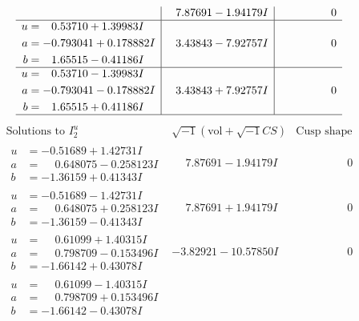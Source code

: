 \documentclass[1p]{elsarticle_modified}
\theoremstyle{definition}
\newcommand{\I}{\sqrt{-1}}
\begin{document}
$$\begin{array}{c|c|c}
 & \phantom{-}7.87691 - 1.94179 I & \phantom{-0.000000 } 0 \\ \hline\begin{aligned}
u &= \phantom{-}0.53710 + 1.39983 I \\
a &= -0.793041 + 0.178882 I \\
b &= \phantom{-}1.65515 - 0.41186 I\end{aligned}
 & \phantom{-}3.43843 - 7.92757 I & \phantom{-0.000000 } 0 \\ \hline\begin{aligned}
u &= \phantom{-}0.53710 - 1.39983 I \\
a &= -0.793041 - 0.178882 I \\
b &= \phantom{-}1.65515 + 0.41186 I\end{aligned}
 & \phantom{-}3.43843 + 7.92757 I & \phantom{-0.000000 } 0\\
 \hline 
 \end{array}$$\newpage$$\begin{array}{c|c|c}  
\text{Solutions to }I^u_{2}& \I (\text{vol} + \sqrt{-1}CS) & \text{Cusp shape}\\
 \hline 
\begin{aligned}
u &= -0.51689 + 1.42731 I \\
a &= \phantom{-}0.648075 - 0.258123 I \\
b &= -1.36159 + 0.41343 I\end{aligned}
 & \phantom{-}7.87691 - 1.94179 I & \phantom{-0.000000 } 0 \\ \hline\begin{aligned}
u &= -0.51689 - 1.42731 I \\
a &= \phantom{-}0.648075 + 0.258123 I \\
b &= -1.36159 - 0.41343 I\end{aligned}
 & \phantom{-}7.87691 + 1.94179 I & \phantom{-0.000000 } 0 \\ \hline\begin{aligned}
u &= \phantom{-}0.61099 + 1.40315 I \\
a &= \phantom{-}0.798709 - 0.153496 I \\
b &= -1.66142 + 0.43078 I\end{aligned}
 & -3.82921 - 10.57850 I & \phantom{-0.000000 } 0 \\ \hline\begin{aligned}
u &= \phantom{-}0.61099 - 1.40315 I \\
a &= \phantom{-}0.798709 + 0.153496 I \\
b &= -1.66142 - 0.43078 I\end{aligned}

\end{array}$$
\end{document}
